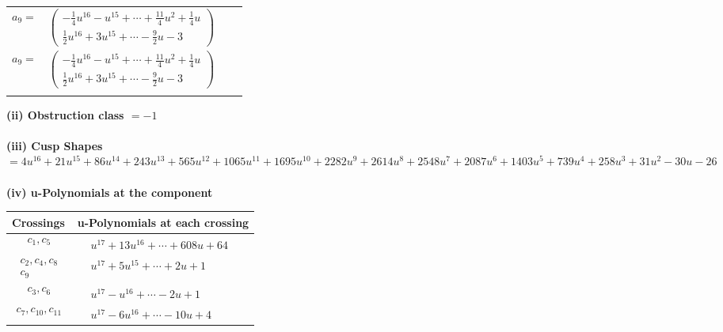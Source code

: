 \documentclass[1p]{elsarticle_modified}
\theoremstyle{definition}
\begin{document}
\begin{tabular}{m{7pt} m{180pt} m{7pt} m{180pt} }
\flushright $a_{9}=$&$\begin{pmatrix}-\frac{1}{4} u^{16}- u^{15}+\cdots+\frac{11}{4} u^2+\frac{1}{4} u\\\frac{1}{2} u^{16}+3 u^{15}+\cdots-\frac{9}{2} u-3\end{pmatrix}$\\ \flushright $a_{9}=$&$\begin{pmatrix}-\frac{1}{4} u^{16}- u^{15}+\cdots+\frac{11}{4} u^2+\frac{1}{4} u\\\frac{1}{2} u^{16}+3 u^{15}+\cdots-\frac{9}{2} u-3\end{pmatrix}$\\&\end{tabular}
\flushleft \textbf{(ii) Obstruction class $= -1$}\\~\\
\flushleft \textbf{(iii) Cusp Shapes $= 4 u^{16}+21 u^{15}+86 u^{14}+243 u^{13}+565 u^{12}+1065 u^{11}+1695 u^{10}+2282 u^9+2614 u^8+2548 u^7+2087 u^6+1403 u^5+739 u^4+258 u^3+31 u^2-30 u-26$}\\~\\
\newpage\renewcommand{\arraystretch}{1}
\flushleft \textbf{(iv) u-Polynomials at the component}\newline \\
\begin{tabular}{m{50pt}|m{274pt}}
Crossings & \hspace{64pt}u-Polynomials at each crossing \\
\hline $$\begin{aligned}c_{1},c_{5}\end{aligned}$$&$\begin{aligned}
&u^{17}+13 u^{16}+\cdots+608 u+64
\end{aligned}$\\
\hline $$\begin{aligned}c_{2},c_{4},c_{8}\\c_{9}\end{aligned}$$&$\begin{aligned}
&u^{17}+5 u^{15}+\cdots+2 u+1
\end{aligned}$\\
\hline $$\begin{aligned}c_{3},c_{6}\end{aligned}$$&$\begin{aligned}
&u^{17}- u^{16}+\cdots-2 u+1
\end{aligned}$\\
\hline $$\begin{aligned}c_{7},c_{10},c_{11}\end{aligned}$$&$\begin{aligned}
&u^{17}-6 u^{16}+\cdots-10 u+4
\end{aligned}$\\
\hline
\end{tabular}\\~\\
\end{document}
